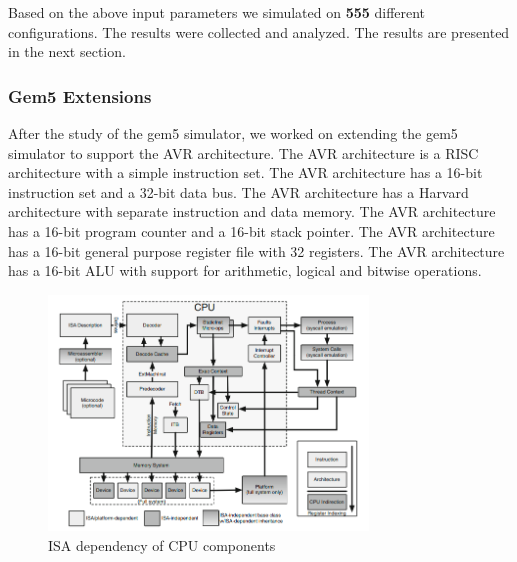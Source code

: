 Based on the above input parameters we simulated on \textbf{555} different configurations. The results were collected and analyzed. The results are presented in the next section.

\subsubsection{\textbf{Gem5 Extensions}}
After the study of the gem5 simulator, we worked on extending the gem5 simulator to support the AVR architecture. The AVR architecture is a RISC architecture with a simple instruction set. The AVR architecture has a 16-bit instruction set and a 32-bit data bus. The AVR architecture has a Harvard architecture with separate instruction and data memory. The AVR architecture has a 16-bit program counter and a 16-bit stack pointer. The AVR architecture has a 16-bit general purpose register file with 32 registers. The AVR architecture has a 16-bit ALU with support for arithmetic, logical and bitwise operations.

\begin{figure}[h]
	\centering
	\includegraphics[width=8.5cm]{figs/impl.png}
	\caption{ISA dependency of CPU components}
	\label{fig:isa_dependence}
\end{figure}

